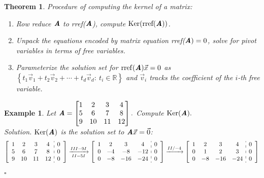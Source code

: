 \documentclass[12pt, a4paper]{article}
\newtheorem{thm}{Theorem}[subsection]
\newtheorem{eg}{Example}[subsection]
\newenvironment*{sol}{\indent\textit{Solution. }}{\hfill{$\square$}\par}
\def\R{{\mathbb{R}}}
\def\rref{\mathrm{rref}}
\def\Ker{\mathrm{Ker}}
\def\vecx{\vec{x}}
\def\vecv{\vec{v}}
\def\matrixA{\textbf{\emph{A}}}
\begin{document}
\begin{thm}\label{thm3.3.4}
	Procedure of computing the kernel of a matrix:
	\begin{enumerate}
		\item Row reduce $\matrixA$ to rref($\matrixA$), compute $\Ker(\text{rref}(\matrixA))$.
		\item Unpack the equations encoded by matrix equation rref($\matrixA)=0$, solve for pivot variables in terms of free variables.
		\item Parameterize the solution set for $\rref(\matrixA)\vecx=0$ as $\left\{t_1\vecv_1+t_2\vecv_2+\cdots+t_d\vecv_d:\ t_i\in\R\right\}$ and $\vecv_i$ tracks the coefficient of the $i$-th free variable.
	\end{enumerate}
\end{thm}
\begin{eg}
	Let $\matrixA=\begin{bmatrix}1&2&3&4\\5&6&7&8\\9&10&11&12\end{bmatrix}.$  Compute $\Ker(\matrixA).$\\
	\begin{sol}
		$\Ker(\matrixA)$ is the solution set to $\matrixA\vecx=\vec{0}$: 
		$$\begin{aligned}
			\left[\begin{array}{c:c}\begin{matrix}1&2&3&4\\5&6&7&8\\9&10&11&12\end{matrix}&\begin{matrix}0\\0\\0\end{matrix}\end{array}\right]\xrightarrow[II-5I]{III-9I}\left[\begin{array}{c:c}\begin{matrix}1&2&3&4\\0&-4&-8&-12\\0&-8&-16&-24\end{matrix}&\begin{matrix}0\\0\\0\end{matrix}\end{array}\right]&\xrightarrow[]{II/-4}\left[\begin{array}{c:c}\begin{matrix}1&2&3&4\\0&1&2&3\\0&-8&-16&-24\end{matrix}&\begin{matrix}0\\0\\0\end{matrix}\end{array}\right]\\

\end{aligned}$$
\end{sol}
\end{eg}
\end{document}
